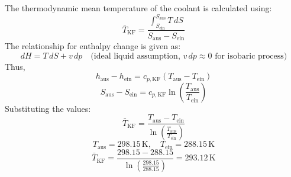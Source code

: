 The thermodynamic mean temperature of the coolant is calculated using:  
\[
\bar{T}_{\text{KF}} = \frac{\int_{S_{\text{ein}}}^{S_{\text{aus}}} T \, dS}{S_{\text{aus}} - S_{\text{ein}}}
\]  
The relationship for enthalpy change is given as:  
\[
dH = T \, dS + v \, dp \quad \text{(ideal liquid assumption, } v \, dp \approx 0 \text{ for isobaric process)}
\]  
Thus,  
\[
h_{\text{aus}} - h_{\text{ein}} = c_{p,\text{KF}} (T_{\text{aus}} - T_{\text{ein}})
\]  
\[
S_{\text{aus}} - S_{\text{ein}} = c_{p,\text{KF}} \ln \left(\frac{T_{\text{aus}}}{T_{\text{ein}}}\right)
\]  
Substituting the values:  
\[
\bar{T}_{\text{KF}} = \frac{T_{\text{aus}} - T_{\text{ein}}}{\ln \left(\frac{T_{\text{aus}}}{T_{\text{ein}}}\right)}
\]  
\[
T_{\text{aus}} = 298.15 \, \text{K}, \quad T_{\text{ein}} = 288.15 \, \text{K}
\]  
\[
\bar{T}_{\text{KF}} = \frac{298.15 - 288.15}{\ln \left(\frac{298.15}{288.15}\right)} = 293.12 \, \text{K}
\]
